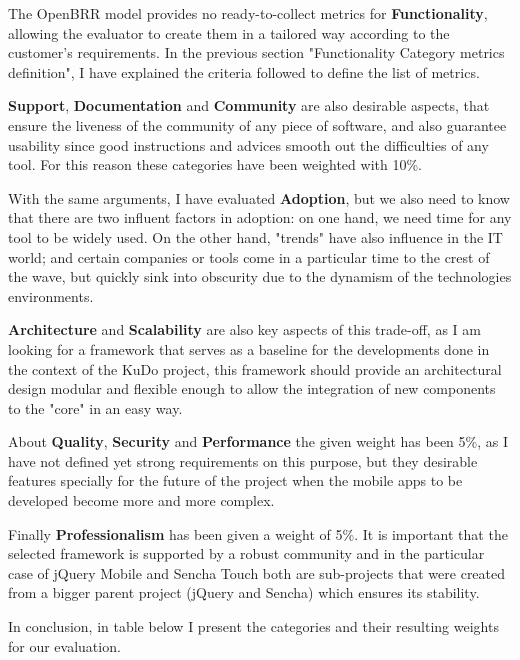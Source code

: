 \documentclass[a4paper,12pt]{book}
\begin{document}
The OpenBRR model provides no ready-to-collect metrics for \textbf{Functionality}, allowing the evaluator to create them in a tailored way according to the customer's requirements. In the previous section "Functionality Category metrics definition", I have explained the criteria followed to define the list of metrics.

\textbf{Support}, \textbf{Documentation} and \textbf{Community} are also desirable aspects, that ensure the liveness of the community of any piece of software, and also guarantee usability since good instructions and advices smooth out the
difficulties of any tool. For this reason these categories have been
weighted with 10\%. 

With the same arguments, I have evaluated \textbf{Adoption}, but we also need to know that there are two influent factors in adoption: on one hand, we need time for any tool to be widely used. On the other hand, "trends" have also influence in the IT world; and certain
companies or tools come in a particular time to the crest of the wave, but quickly sink into obscurity due to the dynamism of the technologies environments. 

\textbf{Architecture}  and \textbf{Scalability} are also key aspects of this trade-off, as I am looking for a framework that serves as a baseline for the developments done in the context of the KuDo project, this framework should provide an architectural design modular and flexible enough to allow the integration of new components to the "core" in an easy way.

About \textbf{Quality}, \textbf{Security} and \textbf{Performance} the given weight has been 5\%, as I have not defined yet strong requirements on this purpose, but they desirable features specially for the future of the project when the mobile apps to be developed become more and more complex.

Finally \textbf{Professionalism} has been given a weight of 5\%. It is important that the selected framework is supported by a robust community and in the particular case of jQuery Mobile and Sencha Touch both are sub-projects that were created from a bigger parent project (jQuery and Sencha) which ensures its stability. 

In conclusion, in table below I present the categories and
their resulting weights for our evaluation.
\end{document}
